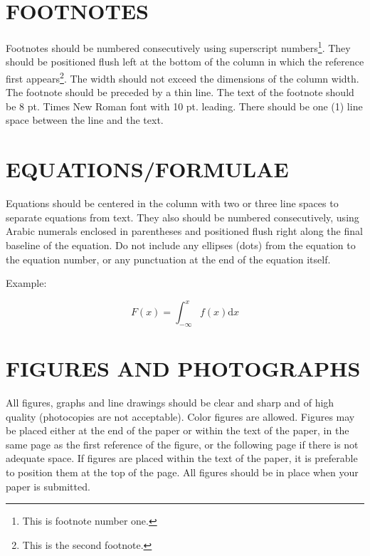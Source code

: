\documentclass[twocolumn,10pt]{tsfp}
\begin{document}
\section*{FOOTNOTES}

Footnotes should be numbered consecutively using superscript numbers\footnote{This is footnote number one.}. They should be positioned flush left at the bottom of the column in which the reference first appears\footnote{This is the second footnote.}. The width should not exceed the dimensions of the column width. The footnote should be preceded by a thin line. The text of the footnote should be 8 pt. Times New Roman font with 10 pt. leading. There should be one (1) line space between the line and the text.

\section*{EQUATIONS/FORMULAE}

Equations should be centered in the column with two or three line spaces to separate equations from text. They also should be numbered consecutively, using Arabic numerals enclosed in parentheses and positioned flush right along the final baseline of the equation. Do not include any ellipses (dots) from the equation to the equation number, or any punctuation at the end of the equation itself.

Example:

\begin{equation}
F(x) = \int_{-\infty}^x f(x) \mathrm{d}x
\label{eq_1}
\end{equation}

\section*{FIGURES AND PHOTOGRAPHS}

All figures, graphs and line drawings should be clear and sharp and of high quality (photocopies are not acceptable). Color figures are allowed. Figures may be placed either at the end of the paper or within the text of the paper, in the same page as the first reference of the figure, or the following page if there is not adequate space. If figures are placed within the text of the paper, it is preferable to position them at the top of the page. All figures should be in place when your paper is submitted.
\end{document}
